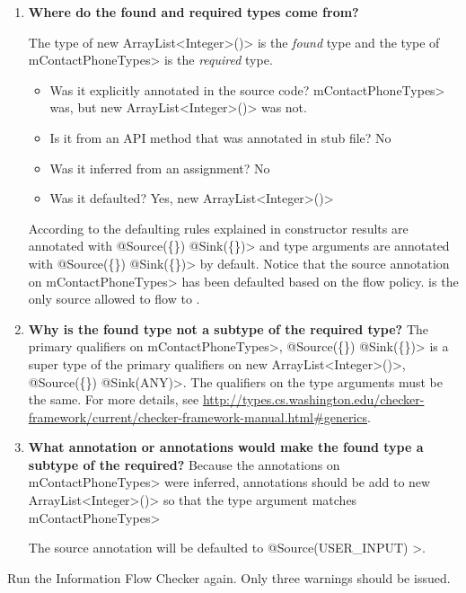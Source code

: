 \begin{enumerate}

\item \textbf{Where do the found  and required types come from?}

The type of \<new ArrayList\textless Integer\textgreater()> is the \emph{found} type and the type of \<mContactPhoneTypes> is
the \emph{required} type.  


 \begin{itemize}
    \item Was it explicitly annotated in the source code?  \<mContactPhoneTypes> was, but \<new ArrayList\textless Integer\textgreater()> was not.
    \item Is it from an API method that was annotated in stub file? No
    \item Was it inferred from an assignment? No
    \item Was it defaulted? Yes, \<new ArrayList\textless Integer\textgreater()> 
    \end{itemize}

 According to the defaulting rules explained in  constructor results
 are annotated with \<@Source(\{\}) @Sink(\{\})> and type arguments are annotated 
 with \<@Source(\{\}) @Sink(\{\})> by 
 default. Notice that the source annotation on \<mContactPhoneTypes> has been defaulted based on the 
 flow policy.   is the only source allowed to flow to . 

 \item\textbf{ Why is the found type not a subtype of the required type?}
The primary qualifiers on \<mContactPhoneTypes>, \<@Source(\{\}) @Sink(\{\})> 
is a super type of the primary qualifiers on \<new ArrayList\textless Integer\textgreater()>,
 \<@Source(\{\}) @Sink(ANY)>.  The qualifiers on the type arguments must be the same. 
For more details, see
\url{http://types.cs.washington.edu/checker-framework/current/checker-framework-manual.html#generics}.

\item\textbf{What annotation or annotations would make the found type a subtype of the required?}
Because the annotations on \<mContactPhoneTypes> were inferred,  annotations should be add to 
\<new ArrayList\textless Integer\textgreater()> so that the type argument matches  \<mContactPhoneTypes> 

 
 The source annotation will be defaulted to \<@Source(USER\_INPUT) >.
 \end{enumerate}
 Run the Information Flow Checker again.  Only three warnings should be issued.
 
